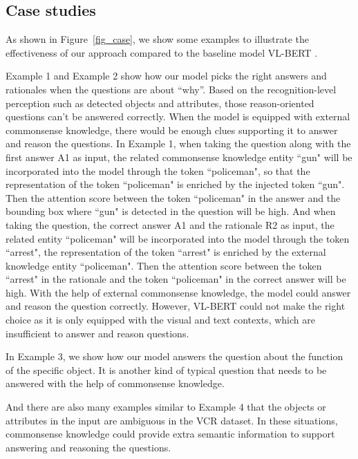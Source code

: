 \documentclass[conference]{IEEEtran}
\begin{document}
\subsection{Case studies}\label{case study}
As shown in Figure~\ref{fig_case}, we show some examples to illustrate the effectiveness of our approach compared to the baseline model VL-BERT \cite{b14}.






Example 1 and Example 2 show how our model picks the right answers and rationales when the questions are about “why”. Based on the recognition-level perception such as detected objects and attributes, those reason-oriented questions can't be answered correctly. When the model is equipped with external commonsense knowledge, there would be enough clues supporting it to answer and reason the questions. In Example 1, when taking the question along with the first answer A1 as input, the related commonsense knowledge entity “gun" will be incorporated into the model through the token “policeman", so that the representation of the token “policeman" is enriched by the injected token “gun". Then the attention score between the token “policeman" in the answer and the bounding box where “gun" is detected in the question will be high. And when taking the question, the correct answer A1 and the rationale R2 as input, the related entity “policeman" will be incorporated into the model through the token “arrest", the representation of the token “arrest" is enriched by the external knowledge entity “policeman". Then the attention score between the token “arrest" in the rationale and the token “policeman" in the correct answer will be high. With the help of external commonsense knowledge, the model could answer and reason the question correctly. However, VL-BERT could not make the right choice as it is only equipped with the visual and text contexts, which are insufficient to answer and reason questions.




In Example 3, we show how our model answers the question about the function of the specific object. It is another kind of typical question that needs to be answered with the help of commonsense knowledge. 


And there are also many examples similar to Example 4 that the objects or attributes in the input are ambiguous in the VCR dataset. In these situations, commonsense knowledge could provide extra semantic information to support answering and reasoning the questions.
\end{document}
